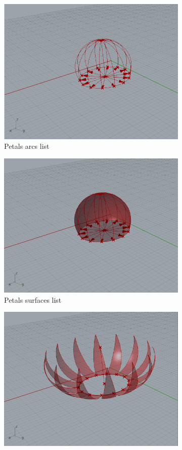 \documentclass[preprint,12pt,3p]{elsarticle}
\begin{document}
\begin{figure}
\begin{subfigure}{0.3\textwidth}
  \centering
  \includegraphics[width=.9\linewidth]{a02s07.png}
  \caption{Petals arcs list}
  \label{fig:a02s07}
\end{subfigure}
\begin{subfigure}{0.3\textwidth}
  \centering
  \includegraphics[width=.9\linewidth]{a02s08.png}
  \caption{Petals surfaces list}
  \label{fig:a02s08}
\end{subfigure}
\begin{subfigure}{0.3\textwidth}
  \centering
  \includegraphics[width=.9\linewidth]{a02s09.png}

\end{subfigure}
\end{figure}
\end{document}
